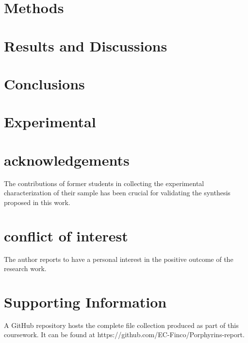 \documentclass[num-refs]{wiley-article}
\begin{document}
\twocolumn
\section{Methods}

\section{Results and Discussions}
\section{Conclusions}
\section{Experimental}

\section*{acknowledgements}
The contributions of former students in collecting the experimental characterization of their sample has been crucial for validating the synthesis proposed in this work.
\section*{conflict of interest}
The author reports to have a personal interest in the positive outcome of the research work.
\section*{Supporting Information}
A GitHub repository hosts the complete file collection produced as part of this coursework.
It can be found at https://github.com/EC-Finco/Porphyrins-report.
\printendnotes



\end{document}
